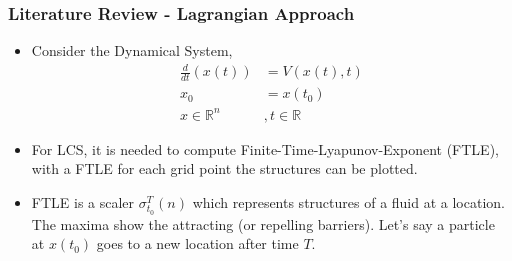\documentclass[../presentation.tex]{subfiles}
\begin{document}

\begin{frame}
  \frametitle{Literature Review - Lagrangian Approach}

  \begin{itemize}
    \item Consider the Dynamical System,
    \begin{equation}
      \begin{aligned}
        \frac{d}{dt}(x(t)) &= V(x(t), t) \\
        x_0 &= x(t_0) \\
        x \in \mathbb{R}^n &, t \in \mathbb{R}
      \end{aligned}
    \end{equation}
  
    \item For LCS, it is needed to compute Finite-Time-Lyapunov-Exponent (FTLE), with a FTLE for each grid point the structures can be plotted.
    
    \item FTLE is a scaler \(\sigma_{t_0}^T(n)\) which represents structures of a fluid at a location. The maxima show the attracting (or repelling barriers). Let's say a particle at \(x(t_0)\) goes to a new location after time \(T\). 
  \end{itemize}
\end{frame}
\end{document}
